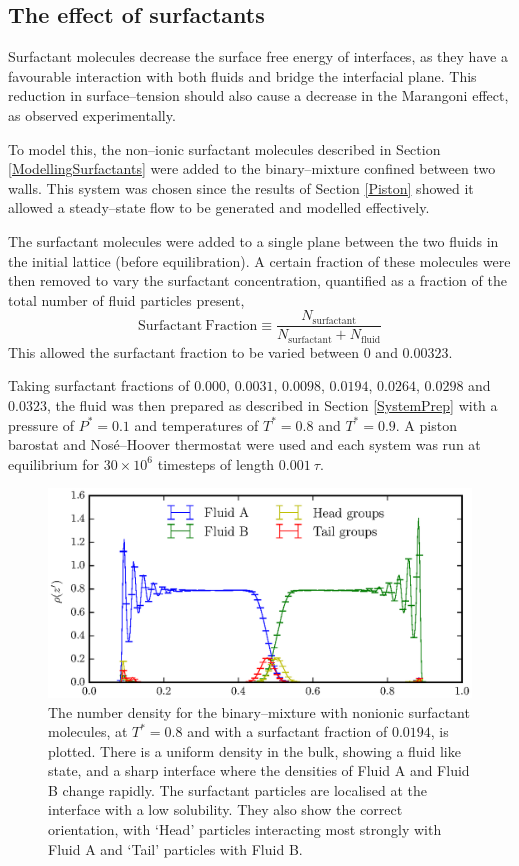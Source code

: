 \subsection{The effect of surfactants}
Surfactant molecules decrease the surface free energy of interfaces, as they have a favourable interaction with both fluids and bridge the interfacial plane.
This reduction in surface--tension should also cause a decrease in the Marangoni effect, as observed experimentally.\cite{KimSubramanianA,KimSubramanianB,BartonSubramanian,ChenStebe}

To model this, the non--ionic surfactant molecules described in Section \ref{ModellingSurfactants} were added to the binary--mixture confined between two walls.
This system was chosen since the results of Section \ref{Piston} showed it allowed a steady--state flow to be generated and modelled effectively.

The surfactant molecules were added to a single plane between the two fluids in the initial lattice (before equilibration).
A certain fraction of these molecules were then removed to vary the surfactant concentration, quantified as a fraction of the total number of fluid particles present,
\begin{equation}
\mathrm{Surfactant\ Fraction} \equiv \frac{N_{\mathrm{surfactant}}}{N_{\mathrm{surfactant}}+N_{\mathrm{fluid}}}
\end{equation}
This allowed the surfactant fraction to be varied between $0$ and $0.00323$.

Taking surfactant fractions of $0.000$, $0.0031$, $0.0098$, $0.0194$, $0.0264$, $0.0298$ and $0.0323$, the fluid was then prepared as described in Section \ref{SystemPrep} with a pressure of $P^{*}=0.1$ and temperatures of $T^{*}=0.8$ and $T^{*}=0.9$.
A piston barostat and Nos\'{e}--Hoover thermostat were used and each system was run at equilibrium for $30 \times 10^{6}$ timesteps of length $0.001\ \tau$.

\begin{figure}[h]
\centering
\includegraphics[scale=0.8]{SurfRho}
\caption{The number density for the binary--mixture with nonionic surfactant molecules, at  $T^{*}=0.8$ and with a surfactant fraction of $0.0194$, is plotted.
There is a uniform density in the bulk, showing a fluid like state, and a sharp interface where the densities of Fluid A and Fluid B change rapidly.
The surfactant particles are localised at the interface with a low solubility.
They also show the correct orientation, with `Head' particles interacting most strongly with Fluid A and `Tail' particles with Fluid B.
}
\label{SurfRho}
\end{figure}

